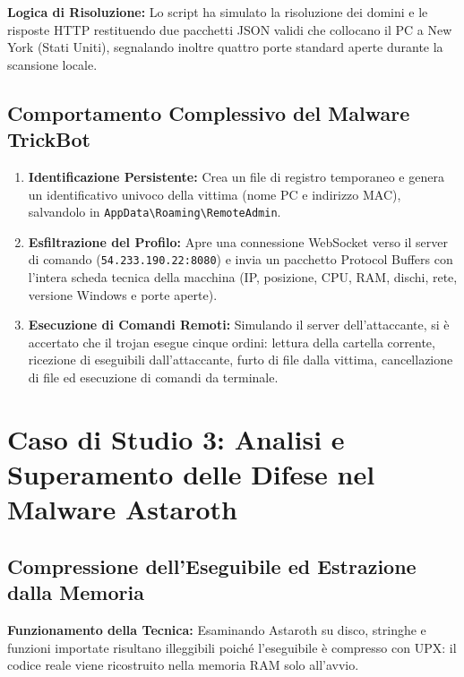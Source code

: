 \documentclass[11pt, a4paper]{article}
\begin{document}
	\textbf{Logica di Risoluzione:} Lo script ha simulato la risoluzione dei domini e le risposte HTTP restituendo due pacchetti JSON validi che collocano il PC a New York (Stati Uniti), segnalando inoltre quattro porte standard aperte durante la scansione locale.
	
	\subsection{Comportamento Complessivo del Malware TrickBot}
	
	\begin{enumerate}
		\item \textbf{Identificazione Persistente:} Crea un file di registro temporaneo e genera un identificativo univoco della vittima (nome PC e indirizzo MAC), salvandolo in \texttt{AppData\textbackslash Roaming\textbackslash RemoteAdmin}.
		\item \textbf{Esfiltrazione del Profilo:} Apre una connessione WebSocket verso il server di comando (\texttt{54.233.190.22:8080}) e invia un pacchetto Protocol Buffers con l'intera scheda tecnica della macchina (IP, posizione, CPU, RAM, dischi, rete, versione Windows e porte aperte).
		\item \textbf{Esecuzione di Comandi Remoti:} Simulando il server dell'attaccante, si è accertato che il trojan esegue cinque ordini: lettura della cartella corrente, ricezione di eseguibili dall'attaccante, furto di file dalla vittima, cancellazione di file ed esecuzione di comandi da terminale.
	\end{enumerate}
	
	\section{Caso di Studio 3: Analisi e Superamento delle Difese nel Malware Astaroth}
	
	\subsection{Compressione dell'Eseguibile ed Estrazione dalla Memoria}
	
	\textbf{Funzionamento della Tecnica:} Esaminando Astaroth su disco, stringhe e funzioni importate risultano illeggibili poiché l'eseguibile è compresso con UPX: il codice reale viene ricostruito nella memoria RAM solo all'avvio.
	
\end{document}
